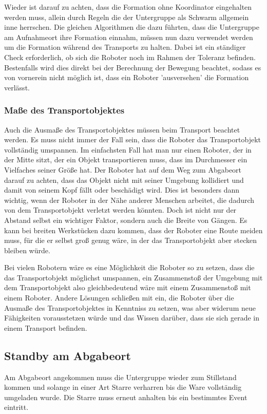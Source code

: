 Wieder ist darauf zu achten, dass die Formation ohne Koordinator eingehalten werden muss, allein durch Regeln die der Untergruppe als Schwarm allgemein inne herrschen.
Die gleichen Algorithmen die dazu führten, dass die Untergruppe am Aufnahmeort ihre Formation einnahm, müssen nun dazu verwendet werden um die Formation während des Transports zu halten. Dabei ist ein ständiger Check erforderlich, ob sich die Roboter noch im Rahmen der Toleranz befinden. Bestenfalls wird dies direkt bei der Berechnung der Bewegung beachtet, sodass es von vornerein nicht möglich ist, dass ein Roboter 'ausversehen' die Formation verlässt.

\subsubsection*{Maße des Transportobjektes}
Auch die Ausmaße des Transportobjektes müssen beim Transport beachtet werden. Es muss nicht immer der Fall sein, dass die Roboter das Transportobjekt vollständig umspannen. Im einfachsten Fall hat man nur einen Roboter, der in der Mitte sitzt, der ein Objekt transportieren muss, dass im Durchmesser ein Vielfaches seiner Größe hat. Der Roboter hat auf dem Weg zum Abgabeort darauf zu achten, dass das Objekt nicht mit seiner Umgebung kollidiert und damit von seinem Kopf fällt oder beschädigt wird. Dies ist besonders dann wichtig, wenn der Roboter in der Nähe anderer Menschen arbeitet, die dadurch von dem Transportobjekt verletzt werden könnten. Doch ist nicht nur der Abstand selbst ein wichtiger Faktor, sondern auch die Breite von Gängen. Es kann bei breiten Werkstücken dazu kommen, dass der Roboter eine Route meiden muss, für die er selbst groß genug wäre, in der das Transportobjekt aber stecken bleiben würde.

Bei vielen Robotern wäre es eine Möglichkeit die Roboter so zu setzen, dass die das Transportobjekt möglichst umspannen, ein Zusammenstoß der Umgebung mit dem Transportobjekt also gleichbedeutend wäre mit einem Zusammenstoß mit einem Roboter. Andere Lösungen schließen mit ein, die Roboter über die Ausmaße des Transportobjektes in Kenntniss zu setzen, was aber widerum neue Fähigkeiten vorausstetzen würde und das Wissen darüber, dass sie sich gerade in einem Transport befinden.

\subsection*{Standby am Abgabeort}
Am Abgabeort angekommen muss die Untergruppe wieder zum Stillstand kommen und solange in einer Art Starre verharren bis die Ware vollständig umgeladen wurde.
Die Starre muss erneut anhalten bis ein bestimmtes Event eintritt.


